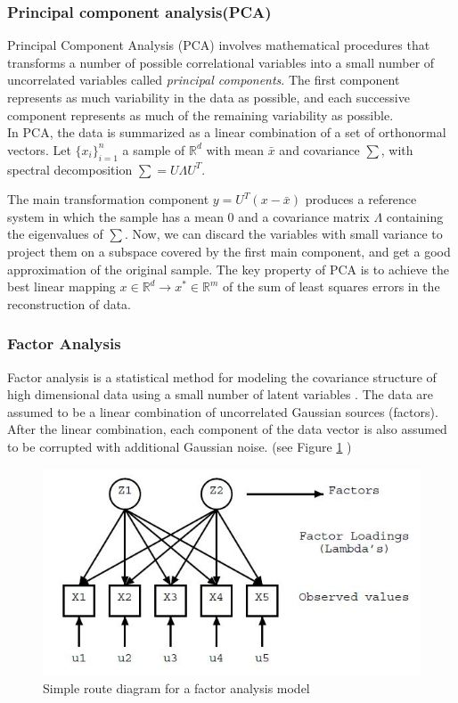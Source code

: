 \documentclass{article}
\begin{document}
\subsubsection{Principal component analysis(PCA)}
Principal Component Analysis (PCA) involves mathematical procedures that transforms a number of possible correlational variables into a small number of uncorrelated variables called \textit{principal components}. The first component represents as much variability in the data as possible, and each successive component represents as much of the remaining variability as possible. \\

In PCA, the data is summarized as a linear combination of a set of orthonormal vectors. Let $\{ x_i \}_{i=1}^n$  a sample of $ \mathbb{R}^d $  with mean $\bar{x}$  and covariance $ \sum $, with spectral decomposition $ \sum = U \Lambda U^T $.

The main transformation component $y= U^T(x-\bar{x})$  produces a reference system in which the sample has a mean $ 0 $ and a covariance matrix $\Lambda$ containing the eigenvalues of $\sum$. Now, we can discard the variables with small variance to project them on a subspace covered by the first main component, and get a good approximation of the original sample. The key property of PCA is to achieve the best linear mapping $x \in \mathbb{R}^d \rightarrow x^* \in \mathbb{R}^m$ of the sum of least squares errors in the reconstruction of data.

\subsubsection{Factor Analysis}
Factor analysis is a statistical method for modeling the covariance structure of high dimensional data using a small number of latent variables \cite{Ghahramani}. The data are assumed to be a linear combination of uncorrelated Gaussian sources (factors). After the linear combination, each component of the data vector is also assumed to be corrupted with additional Gaussian noise. (see Figure \ref{fig:fig_1} )
\begin{figure}[htp]\centering
\includegraphics[width=0.6\columnwidth]{images_fractal/frac_1.JPG}
\caption{ Simple route diagram for a factor analysis model }
\label{fig:fig_1}
\end{figure}
\end{document}
